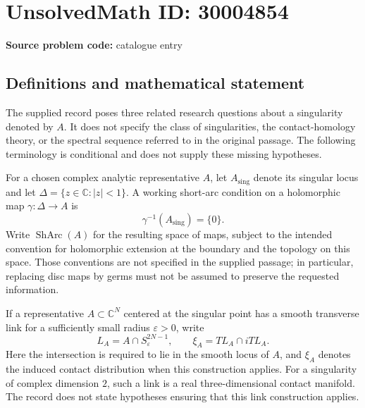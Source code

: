 \documentclass[11pt]{article}
\newcommand{\C}{\mathbb{C}}
\begin{document}
\section*{UnsolvedMath ID: 30004854}
\textbf{Source problem code:} catalogue entry
\subsection{Definitions and mathematical statement}
The supplied record poses three related research questions about a singularity denoted by \(A\). It does not specify the class of singularities, the contact-homology theory, or the spectral sequence referred to in the original passage. The following terminology is conditional and does not supply these missing hypotheses.

For a chosen complex analytic representative \(A\), let \(A_{\mathrm{sing}}\) denote its singular locus and let \(\Delta=\{z\in\C:|z|<1\}\). A working short-arc condition on a holomorphic map \(\gamma:\Delta\to A\) is
\[
\gamma^{-1}(A_{\mathrm{sing}})=\{0\}.
\]
Write \(\operatorname{ShArc}(A)\) for the resulting space of maps, subject to the intended convention for holomorphic extension at the boundary and the topology on this space. Those conventions are not specified in the supplied passage; in particular, replacing disc maps by germs must not be assumed to preserve the requested information.

If a representative \(A\subset\C^N\) centered at the singular point has a smooth transverse link for a sufficiently small radius \(\varepsilon>0\), write
\[
L_A=A\cap S^{2N-1}_{\varepsilon},\qquad
\xi_A=TL_A\cap iTL_A.
\]
Here the intersection is required to lie in the smooth locus of \(A\), and \(\xi_A\) denotes the induced contact distribution when this construction applies. For a singularity of complex dimension \(2\), such a link is a real three-dimensional contact manifold. The record does not state hypotheses ensuring that this link construction applies.
\end{document}
